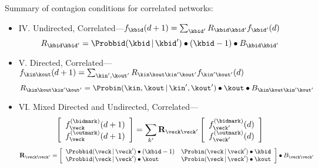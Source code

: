 \begin{frame}
  \small
  \begin{block}{Summary of contagion conditions for correlated networks:}
    \begin{itemize}
    \item<1->
      IV. Undirected, Correlated---$f_{\kbid}(d+1) = 
      \sum_{\kbid'}
      R_{\kbid\kbid'} 
      f_{\kbid'}(d)
      $
      $$
      R_{\kbid\kbid'} =
      \Probbid(\kbid\, |\, \kbid')
      \bullet
      (\kbid-1)
      \bullet
      B_{\kbid\kbid'}
      $$
    \item<2->
      V. Directed, Correlated---$f_{\kin\kout}(d+1) = 
      \sum_{\kin',\kout'}
      R_{\kin\kout\kin'\kout'} 
      f_{\kin'\kout'}(d)
      $ 
      $$
      R_{\kin\kout\kin'\kout'} 
      =
      \Probin(\kin,\kout\, |\, \kin',\kout')
      \bullet
      \kout
      \bullet
      B_{\kin\kout\kin'\kout'} 
      $$ 
    \item<3->
    VI. Mixed Directed and Undirected, Correlated---
    $$
    \left[
    \begin{array}{c}
    f_{\veck}^{\textnormal{(\bidmark)}}(d+1) \\
    f_{\veck}^{\textnormal{(\outmark)}}(d+1)
    \end{array}
    \right]
    =
    \sum_{k'}
    \textbf{R}_{\veck\veck'}
    \left[
    \begin{array}{c}
    f_{\veck'}^{\textnormal{(\bidmark)}}(d) \\
    f_{\veck'}^{\textnormal{(\outmark)}}(d)
    \end{array}
    \right]
    $$
    $$
    \textbf{R}_{\veck\veck'}
    = 
    \left[
    \begin{array}{ll}
      \Probbid(\veck\,|\, \veck')
      \bullet
      (\kbid-1)
      &
      \Probin(\veck\,|\, \veck')
      \bullet
      \kbid
      \\
      \Probbid(\veck\,|\, \veck')
      \bullet
      \kout
      &
      \Probin(\veck\,|\, \veck')
      \bullet
      \kout
    \end{array}
    \right]
    \bullet
    B_{\veck\veck'}
    $$
  \end{itemize}
\end{block}

\end{frame}

